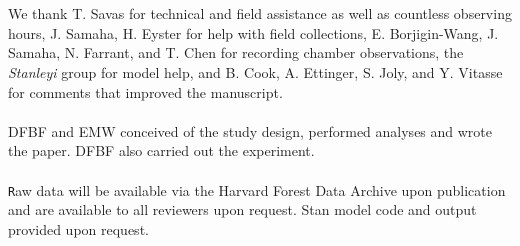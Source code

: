 \documentclass[11pt]{article}
\begin{document}


\vspace{2ex}\\
\vspace{1ex}\\
We thank T. Savas for technical and field assistance as well as countless observing hours, J. Samaha, H. Eyster for help with field collections, E. Borjigin-Wang, J. Samaha, N. Farrant, and T. Chen for recording chamber observations, the \emph{Stanleyi} group for model help, and B. Cook, A. Ettinger, S. Joly, and Y. Vitasse for comments that improved the manuscript. 
\vspace{2ex}\\
\vspace{1ex}\\
DFBF and EMW conceived of the study design, performed analyses and wrote the paper. DFBF also carried out the experiment.
\vspace{2ex}\\
\vspace{1ex}\\
\texttt Raw data will be available via the Harvard Forest Data Archive upon publication and are available to all reviewers upon request. {Stan} model code and output provided upon request.
\newpage



\end{document}
